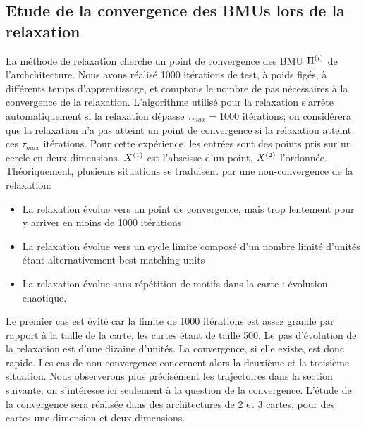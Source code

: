 \subsection{Etude de la convergence des BMUs lors de la relaxation}\label{sec:conv}

La méthode de relaxation cherche un point de convergence des BMU $\Pi^{({i})}$ de l'archchitecture. Nous avons réalisé 1000 itérations de test, à poids figés, à différents temps d'apprentissage, et comptons le nombre de pas nécessaires à la convergence de la relaxation. L'algorithme utilisé pour la relaxation s'arrête automatiquement si la relaxation dépasse $\tau_{max}= 1000$ itérations; on considérera que la relaxation n'a pas atteint un point de convergence si la relaxation atteint ces $\tau_{max}$ itérations.
Pour cette expérience, les entrées sont des points pris sur un cercle en deux dimensions. $X^{({1})}$ est l'abscisse d'un point, $X^{({2})}$ l'ordonnée.
Théoriquement, plusieurs situations se traduisent par une non-convergence de la relaxation:
\begin{itemize}
\item La relaxation évolue vers un point de convergence, mais trop lentement pour y arriver en moins de 1000 itérations
\item La relaxation évolue vers un cycle limite composé d'un nombre limité d'unités étant alternativement best matching units
\item La relaxation évolue sans répétition de motifs dans la carte : évolution chaotique.
\end{itemize}
Le premier cas est évité car la limite de 1000 itérations est assez grande par rapport à la taille de la carte, les cartes étant de taille 500. Le pas d'évolution de la relaxation est d'une dizaine d'unités. La convergence, si elle existe, est donc rapide. Les cas de non-convergence concernent alors la deuxième et la troisième situation.
Nous observerons plus précisément les trajectoires dans la section suivante; on s'intéresse ici seulement à la question de la convergence.
L'étude de la convergence sera réalisée dans des architectures de 2 et 3 cartes, pour des cartes une dimension et deux dimensions.


